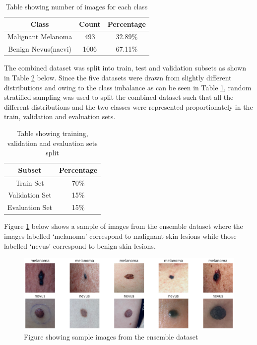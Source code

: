 \documentclass[12pt, a4paper]{article}
\begin{document}
\begin{table}[h]
    \centering
    \begin{tabular}{|c|c|c|}
        \hline
        \textbf{Class}      & \textbf{Count} & \textbf{Percentage} \\\hline
        Malignant Melanoma  & 493            & 32.89\%             \\\hline
        Benign Nevus(naevi) & 1006           & 67.11\%             \\\hline
    \end{tabular}
    \caption{Table showing number of images for each class}
    \label{tab:class_img_count}
\end{table}

The combined dataset was split into train, test and validation subsets as shown in Table \ref{tab:dataset-split} below. Since the five datasets were drawn from slightly different distributions and owing to the class imbalance as can be seen in Table \ref{tab:class_img_count}, random stratified sampling was used to split the combined dataset such that all the different distributions and the two classes were represented proportionately in the train, validation and evaluation sets.

\begin{table}[h]
    \centering
    \begin{tabular}{|c|c|}
        \hline
        \textbf{Subset} & \textbf{Percentage} \\\hline
        Train Set       & 70\%                \\\hline
        Validation Set  & 15\%                \\\hline
        Evaluation Set  & 15\%                \\\hline
    \end{tabular}
    \caption{Table showing training, validation and evaluation sets split}
    \label{tab:dataset-split}
\end{table}

Figure \ref{fig:samples} below shows a sample of images from the ensemble dataset where the images labelled `melanoma' correspond to malignant skin lesions while those labelled `nevus' correspond to benign skin lesions.

\begin{figure}[h]
    \centering
    \setlength{\fboxsep}{8pt}
    \includegraphics[scale=0.4, fbox]{images/samples.png}
    \caption{Figure showing sample images from the ensemble dataset}
    \label{fig:samples}
\end{figure}
\end{document}
